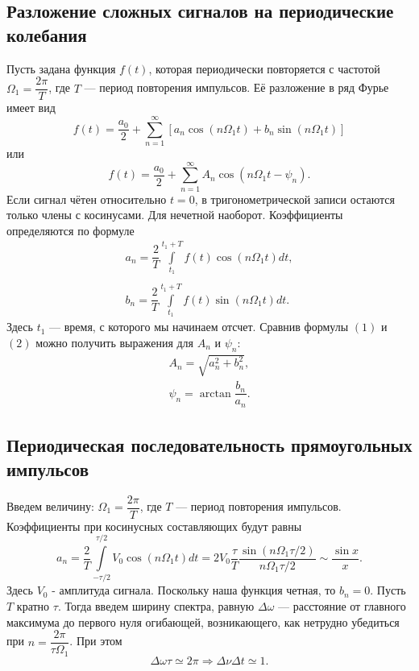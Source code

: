 \documentclass[a4paper, 12pt]{article}
\begin{document}
\subsection*{Разложение сложных сигналов на периодические колебания}

Пусть задана функция $f(t)$, которая периодически повторяется с частотой $\Omega_1 = \dfrac{2\pi}{T}$, где $T$ --- период повторения импульсов. Её разложение в ряд Фурье имеет вид 
\begin{equation}
f(t) = \dfrac{a_0}{2} + \sum\limits_{n = 1}^{\infty}\left[a_n \cos \left(n \Omega_1t\right) + b_n \sin \left(n \Omega_1t\right)\right]
\end{equation}
или
\begin{equation}
f(t) = \dfrac{a_0}{2} + \sum\limits_{n = 1}^{\infty}A_n \cos \left(n\Omega_1t-\psi_n\right).
\end{equation}
Если сигнал чётен относительно $t=0$, в тригонометрической записи остаются только члены с косинусами. Для нечетной наоборот.
Коэффициенты определяются по формуле
\begin{equation}
\begin{array}{c}
a_n  = \dfrac{2}{T}\int\limits_{t_1}^{t_1+T}f(t)\cos\left(n \Omega_1 t\right) dt,\\
\\
b_n = \dfrac{2}{T}\int\limits_{t_1}^{t_1+T}f(t)\sin\left(n \Omega_1 t\right) dt.
\end{array}
\end{equation}
Здесь $t_1$ --- время, с которого мы начинаем отсчет.
Сравнив формулы $(1)$ и $(2)$ можно получить выражения для $A_n$  и $\psi_n$:
\begin{equation}
\begin{array}{l}
A_n = \sqrt{a_n^2+b_n^2},\\
 \psi_n = \arctan \dfrac{b_n}{a_n}.
\end{array}
\end{equation}
\subsection*{Периодическая последовательность прямоугольных импульсов}
Введем величину: $\Omega_1 = \dfrac{2\pi}{T}$,
где $T$ --- период повторения импульсов.
Коэффициенты при косинусных составляющих будут равны
\begin{equation}
a_n = \dfrac{2}{T}\int\limits_{-\tau/2}^{\tau/2}V_0\cos\left(n\Omega_1 t\right)dt = 2V_0\dfrac{\tau}{T}\dfrac{\sin\left(n\Omega_1\tau/2\right)}{n\Omega_1\tau/2} \sim \dfrac{\sin x}{x}.
\end{equation}
Здесь $V_0$ - амплитуда сигнала.
Поскольку наша функция четная, то $b_n = 0$. 
Пусть $T$ кратно $\tau$. Тогда введем ширину спектра, равную $\Delta \omega$ --- расстояние от главного максимума до первого нуля огибающей, возникающего, как нетрудно убедиться при $n = \dfrac{2\pi}{\tau \Omega_1}$. При 
этом
\begin{equation}
\Delta \omega \tau \simeq 2\pi \Rightarrow \Delta \nu \Delta t \simeq 1.
\end{equation}
\end{document}
